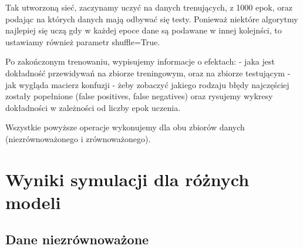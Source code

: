 \documentclass[11pt, a4paper, notitlepage]{report}
\begin{document}
Tak utworzoną sieć, zaczynamy uczyć na danych trenujących, z 1000 epok, oraz podając na których danych mają odbywać się testy.
Ponieważ niektóre algorytmy najlepiej się uczą gdy w każdej epoce dane są podawane w innej kolejnści, to ustawiamy również parametr shuffle=True.

Po zakończonym trenowaniu, wypisujemy informacje o efektach:
- jaka jest dokładność przewidywań na zbiorze treningowym, oraz na zbiorze testującym
- jak wygląda macierz konfuzji - żeby zobaczyć jakiego rodzaju błędy najczęściej zostały popełnione (false positives, false negatives)
oraz rysujemy wykresy dokładności w zależności od liczby epok uczenia.

Wszystkie powyższe operacje wykonujemy dla obu zbiorów danych (niezrównoważonego i zrównoważonego).

\section{Wyniki symulacji dla różnych modeli}

\subsection{Dane niezrównoważone}
\end{document}
